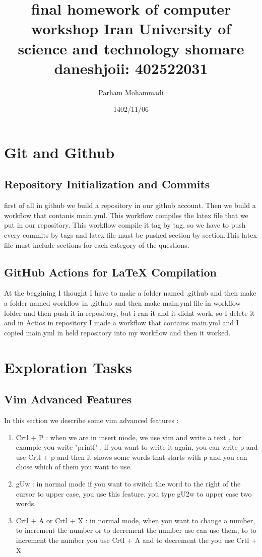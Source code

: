 \documentclass[titlepage]{article}
\title{ \textbf{final homework of computer workshop} \newline Iran University of science and technology \newline \newline shomare daneshjoii: 402522031}
\author{Parham Mohammadi }
\date{1402/11/06}
\begin{document}
\maketitle

\pagestyle{fancy}
\fancyhead[R]{}

\tableofcontents
\newpage
{}
\fancyhead[R]{}
\section{Git and Github}
\subsection{ Repository Initialization and Commits}
first of all in github we build a repository in our github account. Then we build a workflow that contanis main.yml. This workflow compiles the latex file that we put in our repository. This workflow compile it tag by tag, so we have to push every commits by tags and latex file must be pushed section by section.This latex file must include sections for each category of the questions.
\subsection{ GitHub Actions for LaTeX Compilation}
At the beggining I thought I have to make a folder named .github and then make a folder named workflow in .github and then make main.yml file in workflow folder and then push it in repository, but i ran it and it didnt work, so I delete it and in Actios in repository I made a workflow that contains main.yml and I copied main.yml in held repository into my workflow and then it worked.
\section{ Exploration Tasks}
\subsection{Vim Advanced Features}
In this section we describe some vim advanced features :
\begin{enumerate}
\item Crtl + P : when we are in insert mode, we use vim and write a text , for example you write "printf" , if you want to write it again, you can write p and use Crtl + p and then it shows some words that starts with p and you can chose which of them you want to use.
\item gUw : in normal mode if you want to switch the word to the right of the cursor to upper case, you use this feature. you type gU2w to upper case two words.
\item Crtl + A or Crtl + X : in normal mode, when you want to change a number, to increment the number or to decrement the number use can use them, to to increment the number you use Crtl + A and to decrement the you use Crtl + X
\end{enumerate}
\end{document}

